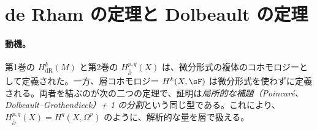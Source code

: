 \section{de Rham の定理と Dolbeault の定理}\label{sec:deRhamDolb}

\paragraph{動機。}第1巻の $H^k_{\mathrm{dR}}(M)$ と第2巻の $H^{p,q}_{\bar\partial}(X)$ は、微分形式の複体のコホモロジーとして定義された。一方、層コホモロジー $H^k(X,\sF)$ は微分形式を使わずに定義される。両者を結ぶのが次の二つの定理で、証明は\emph{局所的な補題（Poincar\'e、Dolbeault--Grothendieck）+ 1 の分割}という同じ型である。これにより、$H^{p,q}_{\bar\partial}(X)=H^q(X,\Omega^p)$ のように、解析的な量を層で扱える。


